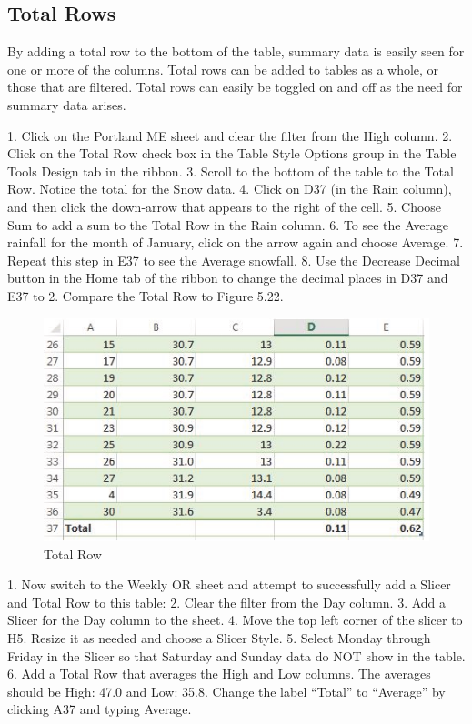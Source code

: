 \subsection{Total Rows}

By adding a total row to the bottom of the table, summary data is easily seen for one or more of the columns. Total rows can be added to tables as a whole, or those that are filtered.
Total rows can easily be toggled on and off as the need for summary data arises.

1. Click on the Portland ME sheet and clear the filter from the High column.
2. Click on the Total Row check box in the Table Style Options group in the Table Tools Design tab
in the ribbon.
3. Scroll to the bottom of the table to the Total Row. Notice the total for the Snow data.
4. Click on D37 (in the Rain column), and then click the down-arrow that appears to the right of
the cell.
5. Choose Sum to add a sum to the Total Row in the Rain column.
6. To see the Average rainfall for the month of January, click on the arrow again and choose
Average.
7. Repeat this step in E37 to see the Average snowfall.
8. Use the Decrease Decimal button in the Home tab of the ribbon to change the decimal places in
D37 and E37 to 2. Compare the Total Row to Figure 5.22.

\begin{figure}[H]
	\centering
	\includegraphics[width=\maxwidth{.95\linewidth}]{gfx/ch05_fig22}
	\caption{Total Row}
	\label{05:fig22}
\end{figure}

1. Now switch to the Weekly OR sheet and attempt to successfully add a Slicer and Total Row to this table:
2. Clear the filter from the Day column.
3. Add a Slicer for the Day column to the sheet.
4. Move the top left corner of the slicer to H5. Resize it as needed and choose a Slicer Style.
5. Select Monday through Friday in the Slicer so that Saturday and Sunday data do NOT show in the table.
6. Add a Total Row that averages the High and Low columns. The averages should be High: 47.0 and Low: 35.8. Change the label ``Total'' to ``Average'' by clicking A37 and typing Average.


